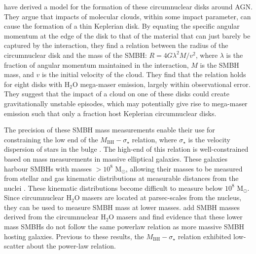 \citet{wardle2012_bhmass} have derived a model for the formation of these circumnuclear disks around AGN. They argue that impacts of molecular clouds, within some impact parameter, can cause the formation of a thin Keplerian disk. By equating the specific angular momentum at the edge of the disk to that of the material that can just barely be captured by the interaction, they find a relation between the radius of the circumnuclear disk and the mass of the SMBH: $R=4G\lambda^2M/v^2$, where $\lambda$ is the fraction of angular momentum maintained in the interaction, $M$ is the SMBH mass, and $v$ is the initial velocity of the cloud. They find that the relation holds for eight disks with H$_2$O mega-maser emission, largely within observational error. They suggest that the impact of a cloud on one of these disks could create gravitationally unstable episodes, which may potentially give rise to mega-maser emission \citep{Milosavljevi_2004} such that only a fraction host Keplerian circumnuclear disks.

The precision of these SMBH mass measurements enable their use for constraining the low end of the $M_{\mathrm{BH}}-\sigma_{\star}$ relation, where $\sigma_{\star}$ is the velocity dispersion of stars in the bulge \citep{greene2010_bhmass}. The high-end of this relation is well-constrained based on mass measurements in massive elliptical galaxies. These galaxies harbour SMBHs with masses $\gt 10^8$ M$_{\odot}$, allowing their masses to be measured from stellar and gas kinematic distributions at measurable distances from the nuclei \citep{greene2010_bhmass}. These kinematic distributions become difficult to measure below $10^8$ M$_{\odot}$. Since circumnuclear H$_2$O masers are located at parsec-scales from the nucleus, they can be used to measure SMBH mass at lower masses. \citet{greene2010_bhmass} add SMBH masses derived from the circumnuclear H$_2$O masers and find evidence that these lower mass SMBHs do not follow the same powerlaw relation as more massive SMBH hosting galaxies. Previous to these results, the $M_{\mathrm{BH}}-\sigma_{\star}$ relation exhibited low-scatter about the power-law relation.

